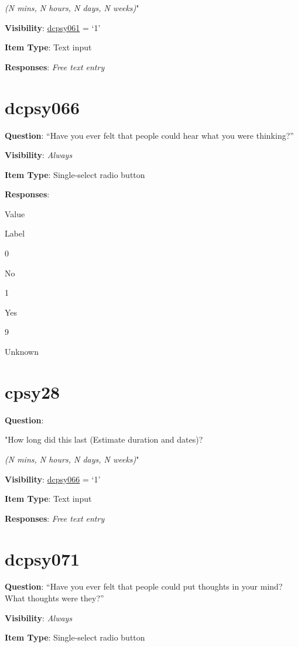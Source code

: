 \documentclass[]{book}
\begin{document}
\emph{(N mins, N hours, N days, N weeks)}"

\textbf{Visibility}: \protect\hyperlink{dcpsy061}{dcpsy061} = `1'

\textbf{Item Type}: Text input

\textbf{Responses}: \emph{Free text entry}

\hypertarget{dcpsy066}{%
\section{dcpsy066}\label{dcpsy066}}

\textbf{Question}: ``Have you ever felt that people could hear what you were thinking?''

\textbf{Visibility}: \emph{Always}

\textbf{Item Type}: Single-select radio button

\textbf{Responses}:

Value

Label

0

No

1

Yes

9

Unknown

\hypertarget{cpsy28}{%
\section{cpsy28}\label{cpsy28}}

\textbf{Question}:

"How long did this last (Estimate duration and dates)?

\emph{(N mins, N hours, N days, N weeks)}"

\textbf{Visibility}: \protect\hyperlink{dcpsy066}{dcpsy066} = `1'

\textbf{Item Type}: Text input

\textbf{Responses}: \emph{Free text entry}

\hypertarget{dcpsy071}{%
\section{dcpsy071}\label{dcpsy071}}

\textbf{Question}: ``Have you ever felt that people could put thoughts in your mind? What thoughts were they?''

\textbf{Visibility}: \emph{Always}

\textbf{Item Type}: Single-select radio button
\end{document}
